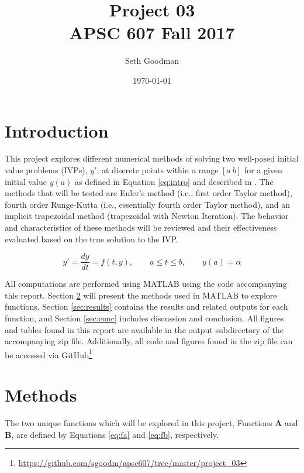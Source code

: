 \documentclass{article}
\title{
	Project 03 \\
	\bigskip
	\normalsize APSC 607 Fall 2017
}
\author{Seth Goodman}
\date{\today}
\begin{document}
\maketitle



\section{Introduction}
\label{sec:introduction}

This project explores different numerical methods of solving two well-posed initial value problems (IVPs), $y'$, at discrete points within a range $[a\ b]$ for a given initial value $y(a)$ as defined in Equation \ref{eq:intro} and described in \cite{burden2010}. The methods that will be tested are Euler's method (i.e., first order Taylor method), fourth order Runge-Kutta (i.e., essentially fourth order Taylor method), and an implicit trapezoidal method (trapezoidal with Newton Iteration). The behavior and characteristics of these methods will be reviewed and their effectiveness evaluated based on the true solution to the IVP.

\begin{equation}
y' = \frac{dy}{dt} = f(t,y), \qquad a \leq t \leq b, \qquad  y(a) = \alpha
\label{eq:intro}
\end{equation}

All computations are performed using MATLAB using the code accompanying this report. Section \ref{sec:methods} will present the methods used in MATLAB to explore functions. Section \ref{sec:results} contains the results and related outputs for each function, and Section \ref{sec:conc} includes discussion and conclusion. All figures and tables found in this report are available in the output subdirectory of the accompanying zip file. Additionally, all code and figures found in the zip file can be accessed via GitHub\footnote{\url{https://github.com/sgoodm/apsc607/tree/master/project_03}}

\newpage
\section{Methods}
\label{sec:methods}

The two unique functions which will be explored in this project, Functions \textbf{A} and \textbf{B}, are defined by Equations \ref{eq:fa} and \ref{eq:fb}, respectively.
\end{document}

